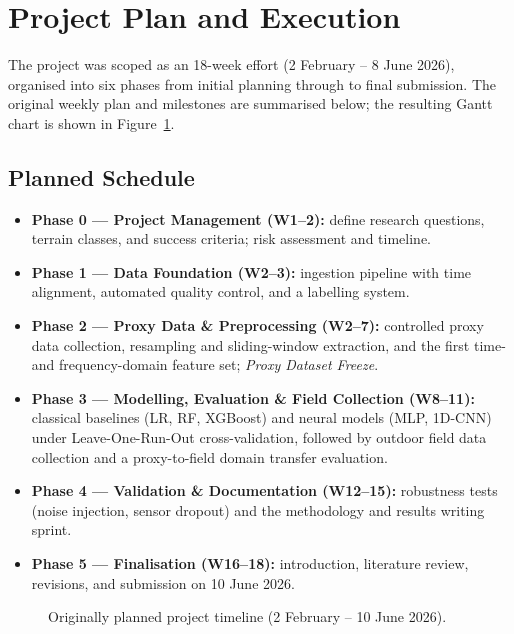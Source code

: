 \newpage
\section{Project Plan and Execution}
\label{sec:project-plan}

The project was scoped as an 18-week effort (2 February – 8 June 2026), organised
into six phases from initial planning through to final submission. The original
weekly plan and milestones are summarised below; the resulting Gantt chart is
shown in Figure~\ref{fig:gantt}.

\subsection{Planned Schedule}

\begin{itemize}
    \item \textbf{Phase 0 — Project Management (W1–2):} define research questions,
          terrain classes, and success criteria; risk assessment and timeline.
    \item \textbf{Phase 1 — Data Foundation (W2–3):} ingestion pipeline with time
          alignment, automated quality control, and a labelling system.
    \item \textbf{Phase 2 — Proxy Data \& Preprocessing (W2–7):} controlled proxy
          data collection, resampling and sliding-window extraction, and the first
          time- and frequency-domain feature set; \emph{Proxy Dataset Freeze}.
    \item \textbf{Phase 3 — Modelling, Evaluation \& Field Collection (W8–11):}
          classical baselines (LR, RF, XGBoost) and neural models (MLP, 1D-CNN)
          under Leave-One-Run-Out cross-validation, followed by outdoor field data
          collection and a proxy-to-field domain transfer evaluation.
    \item \textbf{Phase 4 — Validation \& Documentation (W12–15):} robustness
          tests (noise injection, sensor dropout) and the methodology and results
          writing sprint.
    \item \textbf{Phase 5 — Finalisation (W16–18):} introduction, literature
          review, revisions, and submission on 10 June 2026.
\end{itemize}

\begin{figure}[htbp]
    \centering
    \makebox[\textwidth][c]{%
    \resizebox{1.3\textwidth}{!}{%
    }}
    \caption{Originally planned project timeline (2 February – 10 June 2026).}
    \label{fig:gantt}
\end{figure}

